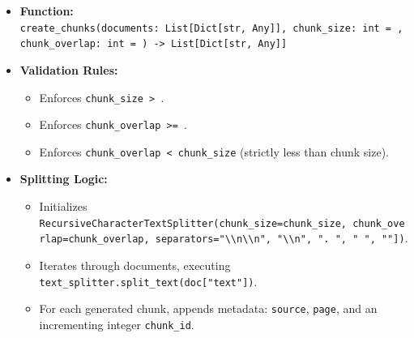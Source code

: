 \documentclass[
]{article}
\providecommand{\tightlist}{%
  \setlength{\itemsep}{0pt}\setlength{\parskip}{0pt}}
\begin{document}
\begin{itemize}
\tightlist
\item
  \textbf{Function:}
  \texttt{create\_\allowbreak chunks(\allowbreak documents:\ \allowbreak List{[}Dict{[}str,\allowbreak \ \allowbreak Any{]}{]},\allowbreak \ \allowbreak chunk\_\allowbreak size:\ \allowbreak int\ \allowbreak =\allowbreak \ ,\allowbreak \ \allowbreak chunk\_\allowbreak overlap:\ \allowbreak int\ \allowbreak =\allowbreak \ )\allowbreak \ \allowbreak -\textgreater{}\allowbreak \ \allowbreak List{[}Dict{[}str,\allowbreak \ \allowbreak Any{]}{]}}
\item
  \textbf{Validation Rules:}

  \begin{itemize}
  \tightlist
  \item
    Enforces \texttt{chunk\_\allowbreak size\ \allowbreak \textgreater{}\ }.
  \item
    Enforces \texttt{chunk\_\allowbreak overlap\ \allowbreak \textgreater{}=\allowbreak \ }.
  \item
    Enforces \texttt{chunk\_\allowbreak overlap\ \allowbreak \textless{}\ \allowbreak chunk\_\allowbreak size} (strictly
    less than chunk size).
  \end{itemize}
\item
  \textbf{Splitting Logic:}

  \begin{itemize}
  \tightlist
  \item
    Initializes
    \texttt{RecursiveCharacterTextSplitter(\allowbreak chunk\_\allowbreak size=\allowbreak chunk\_\allowbreak size,\allowbreak \ \allowbreak chunk\_\allowbreak overlap=\allowbreak chunk\_\allowbreak overlap,\allowbreak \ \allowbreak separators=\allowbreak {[}"\textbackslash{}\textbackslash{}n\textbackslash{}\textbackslash{}n",\allowbreak \ \allowbreak "\textbackslash{}\textbackslash{}n",\allowbreak \ \allowbreak ".\ \allowbreak ",\allowbreak \ \allowbreak "\ \allowbreak ",\allowbreak \ \allowbreak ""{]})\allowbreak }.
  \item
    Iterates through documents, executing
    \texttt{text\_\allowbreak splitter.\allowbreak split\_\allowbreak text(\allowbreak doc{[}"text"{]})\allowbreak }.
  \item
    For each generated chunk, appends metadata: \texttt{source},
    \texttt{page}, and an incrementing integer \texttt{chunk\_\allowbreak id}.
  \end{itemize}
\end{itemize}
\end{document}
